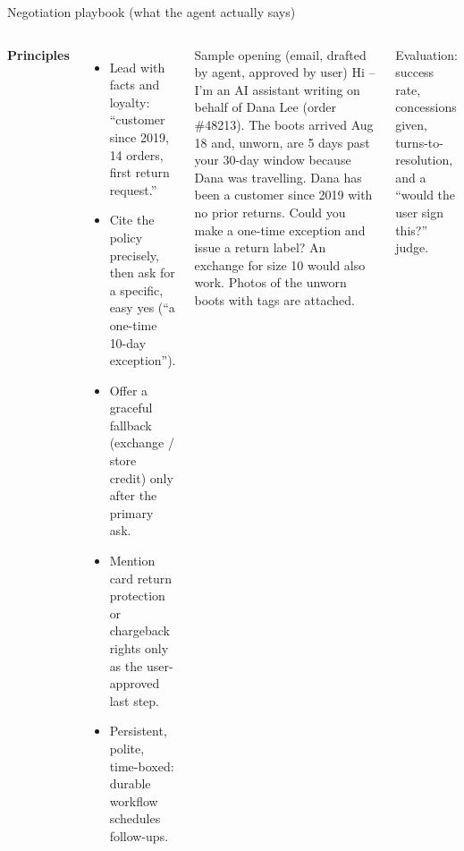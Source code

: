 \documentclass[aspectratio=169,10pt]{beamer}
\begin{document}
\begin{frame}{Negotiation playbook (what the agent actually says)}
\begin{columns}[T]
\small
\textbf{Principles}
\begin{itemize}
  \item Lead with facts and loyalty: ``customer since 2019, 14 orders, first return request.''
  \item Cite the policy precisely, then ask for a specific, easy yes (``a one-time 10-day exception'').
  \item Offer a graceful fallback (exchange / store credit) only after the primary ask.
  \item Mention card return protection or chargeback rights only as the user-approved last step.
  \item Persistent, polite, time-boxed: durable workflow schedules follow-ups.
\end{itemize}
\scriptsize
\begin{block}{Sample opening (email, drafted by agent, approved by user)}
Hi -- I'm an AI assistant writing on behalf of Dana Lee (order \#48213). The boots arrived Aug 18 and, unworn, are
5 days past your 30-day window because Dana was travelling. Dana has been a customer since 2019 with no prior
returns. Could you make a one-time exception and issue a return label? An exchange for size 10 would also work.
Photos of the unworn boots with tags are attached.
\end{block}
\vspace{2pt}
{\color{slate}Evaluation: success rate, concessions given, turns-to-resolution, and a ``would the user sign this?'' judge.}
\end{columns}
\end{frame}

\end{document}
